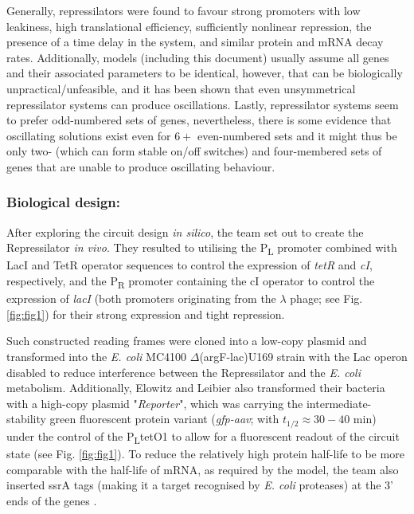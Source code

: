 \documentclass[runningheads,a4paper]{llncs}
\begin{document}
Generally, repressilators were found to favour strong promoters with low leakiness, high translational efficiency, sufficiently nonlinear repression, the presence of a time delay in the system, and similar protein and mRNA decay rates. Additionally, models (including this document) usually assume all genes and their associated parameters to be identical\cite{Purcell2010a}, however, that can be biologically unpractical/unfeasible, and it has been shown that even unsymmetrical repressilator systems can produce oscillations\cite{Strelkowa2010}. Lastly, repressilator systems seem to prefer odd-numbered sets of genes, nevertheless, there is some evidence that oscillating solutions exist even for $6+$ even-numbered sets and it might thus be only two- (which can form stable on/off switches) and four-membered sets of genes that are unable to produce oscillating behaviour\cite{Purcell2010a,Strelkowa2010}.

\subsubsection*{Biological design:} After exploring the circuit design \textit{in silico}, the team set out to create the Repressilator \textit{in vivo}. They resulted to utilising the P\textsubscript{L} promoter  combined with LacI and TetR operator sequences to control the expression of \textit{tetR} and \textit{cI}, respectively, and the P\textsubscript{R} promoter containing the cI operator to control the expression of \textit{lacI} (both promoters originating from the $\lambda$ phage; see Fig. \ref{fig:fig1}) for their strong expression and tight repression\cite{Elowitz2000d}. 

Such constructed reading frames were cloned into a low-copy plasmid and transformed into the \textit{E. coli} MC4100 $\Delta$(argF-lac)U169 strain with the Lac operon disabled to reduce interference between the Repressilator and the \textit{E. coli} metabolism\cite{Elowitz2000d}. Additionally, Elowitz and Leibier also transformed their bacteria with a high-copy plasmid "\textit{Reporter}", which was carrying the intermediate-stability green fluorescent protein variant (\textit{gfp-aav}; with $t_{1/2} \approx 30-40$ min)\cite{Andersen1998} under the control of the P\textsubscript{L}tetO1 to allow for a fluorescent readout of the circuit state (see Fig. \ref{fig:fig1})\cite{Elowitz2000d}. To reduce the relatively high protein half-life to be more comparable with the half-life of mRNA, as required by the model, the team also inserted ssrA tags (making it a target recognised by \textit{E. coli} proteases) at the 3' ends of the genes \cite{Elowitz2000d}.
\end{document}
